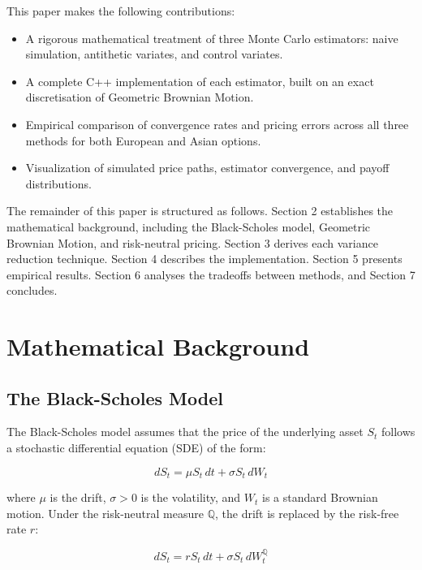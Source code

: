 \documentclass[12pt]{article}
\begin{document}
This paper makes the following contributions:
\begin{itemize}
    \item A rigorous mathematical treatment of three Monte Carlo estimators:
    naive simulation, antithetic variates, and control variates.
    \item A complete C++ implementation of each estimator, built on an exact
    discretisation of Geometric Brownian Motion.
    \item Empirical comparison of convergence rates and pricing errors across
    all three methods for both European and Asian options.
    \item Visualization of simulated price paths, estimator convergence, and
    payoff distributions.
\end{itemize}

The remainder of this paper is structured as follows. Section 2 establishes
the mathematical background, including the Black-Scholes model, Geometric
Brownian Motion, and risk-neutral pricing. Section 3 derives each variance
reduction technique. Section 4 describes the implementation. Section 5
presents empirical results. Section 6 analyses the tradeoffs between methods,
and Section 7 concludes.

\section{Mathematical Background}

\subsection{The Black-Scholes Model}

The Black-Scholes model assumes that the price of the underlying asset
$S_t$ follows a stochastic differential equation (SDE) of the form:

\begin{equation}
    dS_t = \mu S_t \, dt + \sigma S_t \, dW_t
\end{equation}

where $\mu$ is the drift, $\sigma > 0$ is the volatility, and $W_t$ is a
standard Brownian motion. Under the risk-neutral measure $\mathbb{Q}$,
the drift is replaced by the risk-free rate $r$:

\begin{equation}
    dS_t = r S_t \, dt + \sigma S_t \, dW_t^{\mathbb{Q}}
\end{equation}
\end{document}
